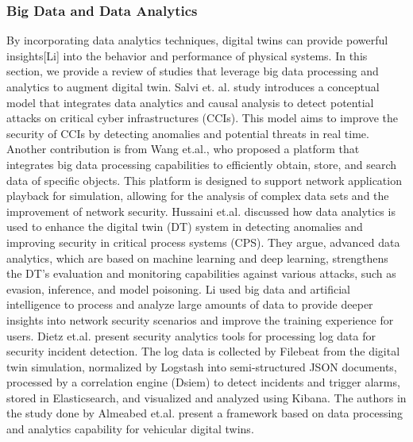 \subsubsection{Big Data and Data Analytics}
By incorporating data analytics techniques, digital twins can provide powerful insights[Li] into the behavior and performance of physical systems. In this section, we provide a review of studies that leverage big data processing and analytics to augment digital twin.  
Salvi et. al.\cite{salviCyberresilienceCriticalCyber2022} study introduces a conceptual model that integrates data analytics and causal analysis to detect potential attacks on critical cyber infrastructures (CCIs). This model aims to improve the security of CCIs by detecting anomalies and potential threats in real time. 
Another contribution is from Wang et.al.\cite{wangDTCPNDigitalTwin2022}, who proposed a platform that integrates big data processing capabilities to efficiently obtain, store, and search data of specific objects. This platform is designed to support network application playback for simulation, allowing for the analysis of complex data sets and the improvement of network security. Hussaini et.al.\cite{hussainiTaxonomySecurityDefense2022} discussed how data analytics is used to enhance the digital twin (DT) system in detecting anomalies and improving security in critical process systems (CPS). They argue, advanced data analytics, which are based on machine learning and deep learning, strengthens the DT's evaluation and monitoring capabilities against various attacks, such as evasion, inference, and model poisoning. 
Li \cite{jiaqiliSpaceSpiderHyper2022} used big data and artificial intelligence to process and analyze large amounts of data to provide deeper insights into network security scenarios and improve the training experience for users.  
Dietz et.al. \cite{dietzIntegratingDigitalTwin2020} present security analytics tools for processing log data for security incident detection. The log data is collected by Filebeat from the digital twin simulation, normalized by Logstash into semi-structured JSON documents, processed by a correlation engine (Dsiem) to detect incidents and trigger alarms, stored in Elasticsearch, and visualized and analyzed using Kibana. The authors in the study done by Almeabed et.al.\cite{almeaibedDigitalTwinAnalysis2021} present a framework based on data processing and analytics capability for vehicular digital twins.  
